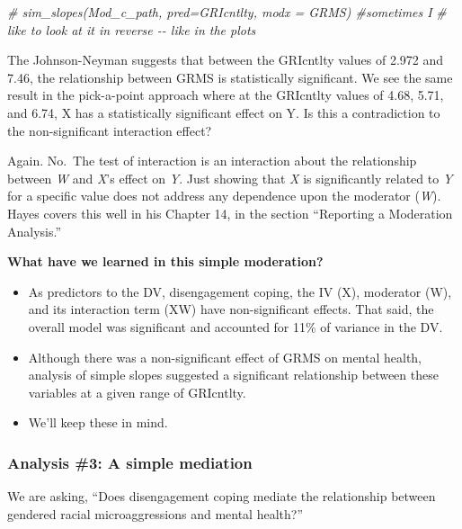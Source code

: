 \documentclass[
  11pt,
]{book}
\newenvironment{Shaded}{\begin{snugshade}}{\end{snugshade}}
\newcommand{\CommentTok}[1]{\textcolor[rgb]{0.37,0.37,0.37}{\textit{#1}}}
\providecommand{\tightlist}{%
  \setlength{\itemsep}{0pt}\setlength{\parskip}{0pt}}
\begin{document}
\begin{Shaded}
\begin{Highlighting}[]
\CommentTok{\# sim\_slopes(Mod\_c\_path, pred=GRIcntlty, modx = GRMS) \#sometimes I}
\CommentTok{\# like to look at it in reverse {-}{-} like in the plots}
\end{Highlighting}
\end{Shaded}

The Johnson-Neyman suggests that between the GRIcntlty values of 2.972 and 7.46, the relationship between GRMS is statistically significant. We see the same result in the pick-a-point approach where at the GRIcntlty values of 4.68, 5.71, and 6.74, X has a statistically significant effect on Y. Is this a contradiction to the non-significant interaction effect?

Again. No.~The test of interaction is an interaction about the relationship between \emph{W} and \emph{X}'s effect on \emph{Y}. Just showing that \emph{X} is significantly related to \emph{Y} for a specific value does not address any dependence upon the moderator (\emph{W}). Hayes \citeyearpar{hayes_introduction_2018} covers this well in his Chapter 14, in the section ``Reporting a Moderation Analysis.''

\textbf{What have we learned in this simple moderation?}

\begin{itemize}
\tightlist
\item
  As predictors to the DV, disengagement coping, the IV (X), moderator (W), and its interaction term (XW) have non-significant effects. That said, the overall model was significant and accounted for 11\% of variance in the DV.
\item
  Although there was a non-significant effect of GRMS on mental health, analysis of simple slopes suggested a significant relationship between these variables at a given range of GRIcntlty.
\item
  We'll keep these in mind.
\end{itemize}

\hypertarget{analysis-3-a-simple-mediation}{%
\subsubsection{Analysis \#3: A simple mediation}\label{analysis-3-a-simple-mediation}}

We are asking, ``Does disengagement coping mediate the relationship between gendered racial microaggressions and mental health?''
\end{document}
